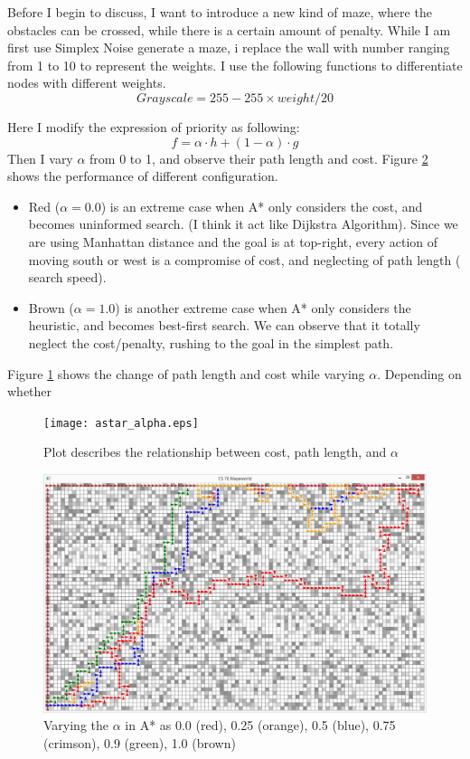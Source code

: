 Before I begin to discuss, I want to introduce a new kind of maze, where the obstacles can be crossed, while there is a certain amount of penalty. While I am first use Simplex Noise generate a maze, i replace the wall with number ranging from 1 to 10 to represent the weights. I use the following functions to differentiate nodes with different weights.
$$Grayscale = 255 - 255 \times weight / 20$$

Here I modify the expression of priority as following:
$$f = \alpha \cdot h + (1 - \alpha ) \cdot g$$
Then I vary $\alpha$ from 0 to 1, and observe their path length and cost. Figure \ref{s-2} shows the performance of different configuration. 
\begin{itemize}
  \item Red ($\alpha = 0.0$) is an extreme case when A* only considers the cost, and becomes uninformed search. (I think it act like Dijkstra Algorithm). Since we are using Manhattan distance and the goal is at top-right, every action of moving south or west is a compromise of cost, and neglecting of path length ( search speed).
  \item Brown ($\alpha = 1.0$) is another extreme case when A* only considers the heuristic, and becomes best-first search. We can observe that it totally neglect the cost/penalty, rushing to the goal in the simplest path.
\end{itemize}
Figure \ref{gh-plot} shows the change of path length and cost while varying $\alpha$. Depending on whether 

\begin{figure}[!h]
\centering
\texttt{[image: astar\_alpha.eps]}
\caption{Plot describes the relationship between cost, path length, and $\alpha$}
\label{gh-plot}
\end{figure}

\begin{figure}[!h]
\centering
\includegraphics[width=1\textwidth]{s-2-1.JPG}
\caption{Varying the $\alpha$ in A* as 0.0 (red), 0.25 (orange), 0.5 (blue), 0.75 (crimson), 0.9 (green), 1.0 (brown)}
\label{s-2}
\end{figure}

